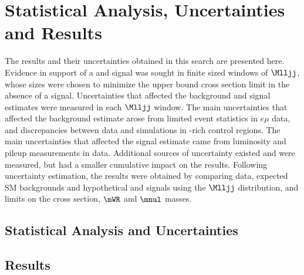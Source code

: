 \chapter{Statistical Analysis, Uncertainties and Results}
\label{statAnalysis_uncerts_results}
The results and their uncertainties obtained in this search are presented here.  Evidence in 
support of a \WR and \nul signal was sought in finite sized windows of $\Mlljj$, whose sizes 
were chosen to minimize the upper bound \WR cross section limit in the absence of a signal.  
Uncertainties that affected the background and signal estimates were measured in each $\Mlljj$ 
window.  The main uncertainties that affected the background estimate arose from limited event 
statistics in $e\mu$ data, and discrepancies between data and simulations in \DY-rich control 
regions.  The main uncertainties that affected the signal estimate came from luminosity and 
pileup measurements in data.  Additional sources of uncertainty existed and were measured, 
but had a smaller cumulative impact on the results.  Following uncertainty estimation, the 
results were obtained by comparing data, expected SM backgrounds and hypothetical 
\WR and \nul signals using the $\Mlljj$ distribution, and limits on the \WR cross section, 
$\mWR$ and $\mnul$ masses.

\section{Statistical Analysis and Uncertainties}
\label{sec:massWindows_uncertainties}


\section{Results}
\label{sec:searchResults}

